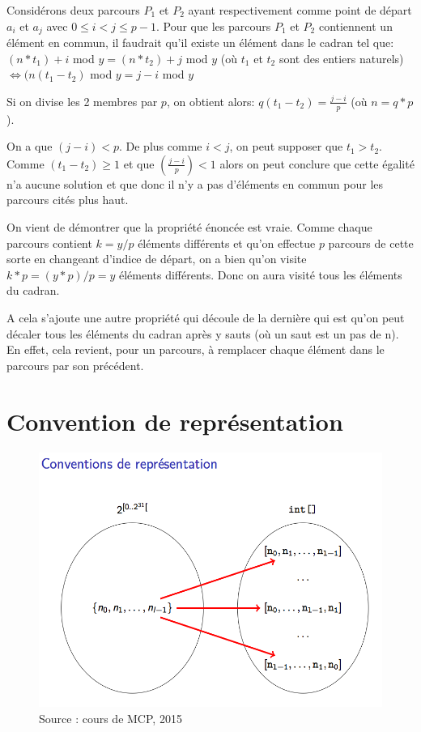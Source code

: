 \documentclass[a4paper, 12pt]{article}
\begin{document}
Considérons deux parcours $P_{1}$ et $P_{2}$ ayant respectivement comme point de départ $a_{i}$ et $a_{j}$ avec $0 \leq i < j \leq p-1$. Pour que les parcours $P_{1}$ et $P_{2}$ contiennent un élément en commun, il faudrait qu'il existe un élément dans le cadran tel que:\newline
$(n*t_{1})+i$ mod $y = (n*t_{2})+j$ mod $y$  (où $t_{1}$ et $t_{2}$ sont des entiers naturels)\newline
$\Leftrightarrow (n(t_{1} - t_{2})$ mod $y = j-i$ mod $y$ \newline

Si on divise les 2 membres par $p$, on obtient alors:\newline
$q(t_{1} - t_{2}) = \frac{j-i}{p}$  (où $n=q*p$).\newline

On a que $(j-i) < p$. De plus comme $i < j$, on peut supposer que $t_{1} > t_{2}$. Comme $(t_{1}-t_{2}) \geq 1$ et que $(\frac{j-i}{p}) < 1$ alors on peut conclure que cette égalité n'a aucune solution et que donc il n'y a pas d'éléments en commun pour les parcours cités plus haut.\newline

On vient de démontrer que la propriété énoncée est vraie. Comme chaque parcours contient $k = y/p$ éléments différents et qu'on effectue $p$ parcours de cette sorte en changeant d'indice de départ, on a bien qu'on visite $k*p = (y*p)/p = y $ éléments différents. Donc on aura visité tous les éléments du cadran. \newline

A cela s'ajoute une autre propriété qui découle de la dernière qui est qu'on peut décaler tous les éléments du cadran après y sauts (où un saut est un pas de n). En effet, cela revient, pour un parcours, à remplacer chaque élément dans le parcours par son précédent.

\section{Convention de représentation}

\begin{figure}[h]
   \includegraphics[scale=0.5]{Conventions.png}
   \caption{Source : cours de MCP, 2015}
\end{figure}
\end{document}
